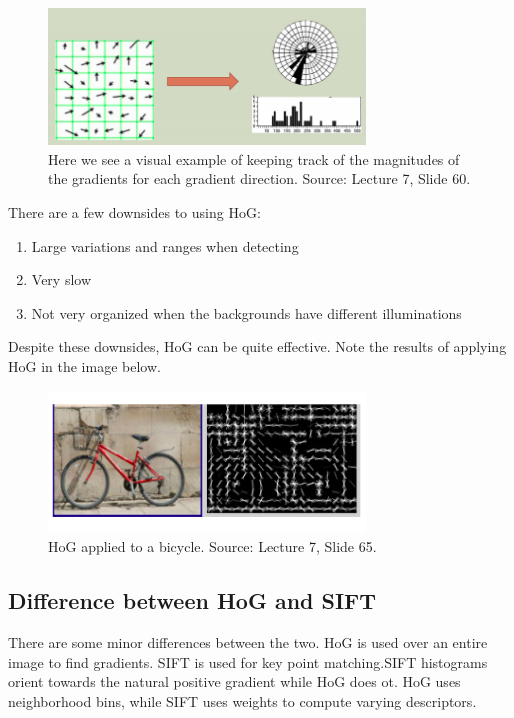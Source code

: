 \documentclass{article}
\begin{document}
\begin{figure}[h]
  \centering
  \includegraphics[width=0.75\textwidth]{histogram}
  \caption{Here we see a visual example of keeping track of the magnitudes of the gradients for each gradient direction. Source: Lecture 7, Slide 60.}
\end{figure}

There are a few downsides to using HoG:
\begin{enumerate}
	\item Large variations and ranges when detecting
    \item Very slow
    \item Not very organized when the backgrounds have different illuminations
\end{enumerate}

Despite these downsides, HoG can be quite effective. Note the results of applying HoG in the image below.

\begin{figure}[h]
  \centering
  \includegraphics[width=0.75\textwidth]{bike}
  \caption{HoG applied to a bicycle. Source: Lecture 7, Slide 65.}
\end{figure}


\subsection{Difference between HoG and SIFT}
There are some minor differences between the two. HoG is used over an entire image to find gradients. SIFT is used for key point matching.SIFT histograms orient towards the natural positive gradient while HoG does ot. HoG uses neighborhood bins, while SIFT uses weights to compute varying descriptors. 
\end{document}
